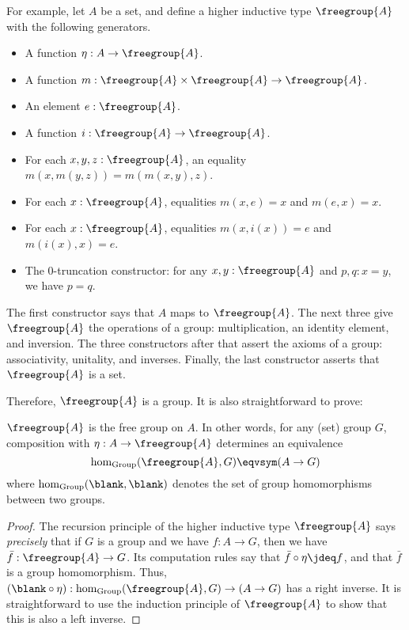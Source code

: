 %
%
For example, let $A$ be a set, and define a higher inductive type $\freegroup{A}$ with the following generators.
\begin{itemize}
\item A function $\eta:A\to \freegroup{A}$.
\item A function $m: \freegroup{A} \times \freegroup{A} \to \freegroup{A}$.
\item An element $e:\freegroup{A}$.
\item A function $i:\freegroup{A} \to \freegroup{A}$.
\item For each $x,y,z:\freegroup{A}$, an equality $m(x,m(y,z)) = m(m(x,y),z)$.
\item For each $x:\freegroup{A}$, equalities $m(x,e) = x$ and $m(e,x) = x$.
\item For each $x:\freegroup{A}$, equalities $m(x,i(x)) = e$ and $m(i(x),x) = e$.
\item The $0$-truncation constructor: for any $x,y:\freegroup{A}$ and $p,q:x=y$, we have $p=q$.
\end{itemize}
The first constructor says that $A$ maps to $\freegroup{A}$.
The next three give $\freegroup{A}$ the operations of a group: multiplication, an identity element, and inversion.
The three constructors after that assert the axioms of a group: associativity, unitality, and inverses.
Finally, the last constructor asserts that $\freegroup{A}$ is a set.

Therefore, $\freegroup{A}$ is a group.
It is also straightforward to prove:

\begin{thm}
  $\freegroup{A}$ is the free group on $A$.
  In other words, for any (set) group $G$, composition with $\eta:A\to \freegroup{A}$ determines an equivalence
  \[ \hom_{\mathrm{Group}}(\freegroup{A},G) \eqvsym (A\to G) \]
  where $\hom_{\mathrm{Group}}(\blank,\blank)$ denotes the set of group homomorphisms between two groups.
\end{thm}
\begin{proof}
  The recursion principle of the higher inductive type $\freegroup{A}$ says \emph{precisely} that if $G$ is a group and we have $f:A\to G$, then we have $\bar{f}:\freegroup{A} \to G$.
  Its computation rules say that $\bar{f}\circ \eta \jdeq f$, and that $\bar f$ is a group homomorphism.
  Thus, $(\blank\circ \eta) :  \hom_{\mathrm{Group}}(\freegroup{A},G) \to (A\to G)$ has a right inverse.
  It is straightforward to use the induction principle of $\freegroup{A}$ to show that this is also a left inverse.
\end{proof}

